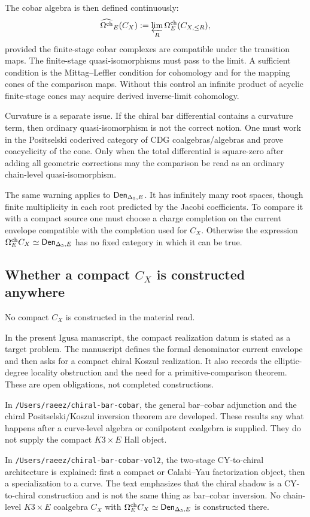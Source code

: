 The cobar algebra is then defined continuously:
\[
        \widehat{\Omega^{\mathrm{ch}}}_E(C_X)
        :=
        \varprojlim_R \Omega^{\mathrm{ch}}_E(C_{X,\leq R}),
\]
provided the finite-stage cobar complexes are compatible under the
transition maps.  The finite-stage quasi-isomorphisms must pass to the
limit.  A sufficient condition is the Mittag--Leffler condition for
cohomology and for the mapping cones of the comparison maps.  Without
this control an infinite product of acyclic finite-stage cones may
acquire derived inverse-limit cohomology.

Curvature is a separate issue.  If the chiral bar differential contains
a curvature term, then ordinary quasi-isomorphism is not the correct
notion.  One must work in the Positselski coderived category of CDG
coalgebras/algebras and prove coacyclicity of the cone.  Only when the
total differential is square-zero after adding all geometric
corrections may the comparison be read as an ordinary chain-level
quasi-isomorphism.

The same warning applies to \(\mathsf{Den}_{\Delta_5,E}\).  It has infinitely many root
spaces, though finite multiplicity in each root predicted by the Jacobi
coefficients.  To compare it with a compact source one must choose a
charge completion on the current envelope compatible with the completion
used for \(C_X\).  Otherwise the expression
\(\Omega^{\mathrm{ch}}_E C_X\simeq\mathsf{Den}_{\Delta_5,E}\) has no fixed category in which it can be
true.

\subsection{Whether a compact \(C_X\) is constructed anywhere}

No compact \(C_X\) is constructed in the material read.

In the present Igusa manuscript, the compact realization datum is stated
as a target problem.  The manuscript defines the formal denominator
current envelope and then asks for a compact chiral Koszul realization.
It also records the elliptic-degree locality obstruction and the need
for a primitive-comparison theorem.  These are open obligations, not
completed constructions.

In \texttt{/Users/raeez/chiral-bar-cobar}, the general bar--cobar
adjunction and the chiral Positselski/Koszul inversion theorem are
developed.  These results say what happens after a curve-level algebra
or conilpotent coalgebra is supplied.  They do not supply the compact
\(K3\times E\) Hall object.

In \texttt{/Users/raeez/chiral-bar-cobar-vol2}, the two-stage
CY-to-chiral architecture is explained: first a compact or Calabi--Yau
factorization object, then a specialization to a curve.  The text
emphasizes that the chiral shadow is a CY-to-chiral construction and is
not the same thing as bar--cobar inversion.  No chain-level
\(K3\times E\) coalgebra \(C_X\) with
\(\Omega^{\mathrm{ch}}_E C_X\simeq\mathsf{Den}_{\Delta_5,E}\) is constructed there.

